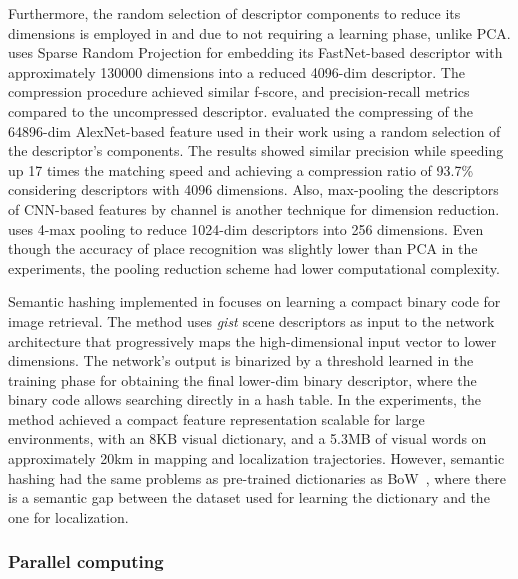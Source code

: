 Furthermore, the random selection of descriptor components to reduce its dimensions is employed in \cite{naseer-et-al:2017:7989305} and \cite{xin-et-al:2017:8310121} due to not requiring a learning phase, unlike PCA.
\cite{naseer-et-al:2017:7989305} uses Sparse Random Projection for embedding its FastNet-based descriptor with approximately 130000 dimensions into a reduced 4096-dim descriptor. The compression procedure achieved similar f-score, and precision-recall metrics compared to the uncompressed descriptor.
\cite{xin-et-al:2017:8310121} evaluated the compressing of the 64896-dim AlexNet-based feature used in their work using a random selection of the descriptor's components. The results showed similar precision while speeding up 17 times the matching speed and achieving a compression ratio of 93.7\% considering descriptors with 4096 dimensions.
Also, max-pooling the descriptors of CNN-based features by channel is another technique for dimension reduction.
\cite{yu-et-al:2019:8961714} uses 4-max pooling to reduce 1024-dim descriptors into 256 dimensions. Even though the accuracy of place recognition was slightly lower than PCA in the experiments, the pooling reduction scheme had lower computational complexity.

Semantic hashing implemented in \cite{ikeda-tanaka:2010:5509579} focuses on learning a compact binary code for image retrieval. The method uses \textit{gist} scene descriptors as input to the network architecture that progressively maps the high-dimensional input vector to lower dimensions. The network's output is binarized by a threshold learned in the training phase for obtaining the final lower-dim binary descriptor, where the binary code allows searching directly in a hash table. In the experiments, the method achieved a compact feature representation scalable for large environments, with an 8KB visual dictionary, and a 5.3MB of visual words on approximately 20km in mapping and localization trajectories. However, semantic hashing had the same problems as pre-trained dictionaries as BoW~\parencite{discussion:bow}, where there is a semantic gap between the dataset used for learning the dictionary and the one for localization.



\subsubsection{Parallel computing}

